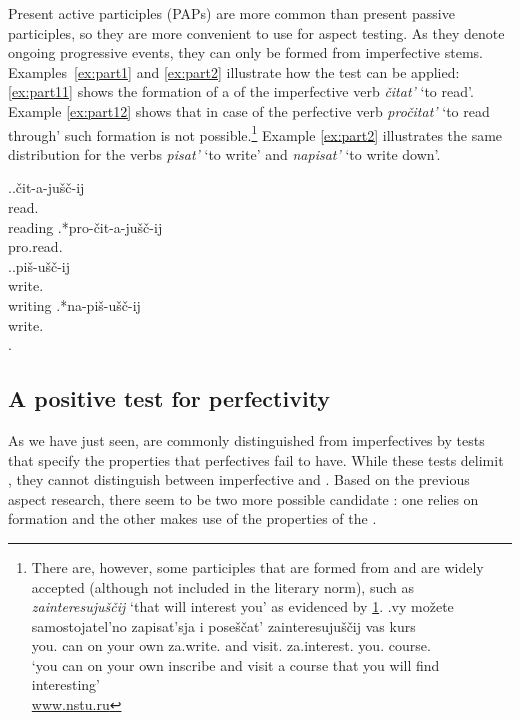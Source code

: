 Present active participles  (PAPs) are more common than present passive participles, so they are more convenient to use for aspect testing. As they denote ongoing progressive events, they can only be formed from imperfective stems. Examples~\ref{ex:part1} and \ref{ex:part2} illustrate how the test can be applied: \ref{ex:part11} shows the formation of a  of the imperfective verb \textit{\v{c}itat'} `to read'. Example \ref{ex:part12} shows that in case of the perfective verb \textit{pro\v{c}itat'} `to read through' such formation is not possible.\footnote{There are, however, some participles that are formed from  and are widely accepted (although not included in the literary norm), such as \textit{zainteresuju\v{s}\v{c}ij} `that will interest you' as evidenced by \ref{ex:PFP}.
\exg.\label{ex:PFP}vy mo\v{z}ete samostojatel'no zapisat'sja i pose\v{s}\v{c}at' zainteresuju\v{s}\v{c}ij vas kurs\\
you. can {on your own} za.write. and visit. za.interest. you. course.\\
\trans `you can on your own inscribe and visit a course that you will find interesting'\\\hbox{} \hfill \hbox{\url{www.nstu.ru}}

} Example \ref{ex:part2} illustrates the same distribution for the verbs \textit{pisat'}\textsuperscript{\IPF} `to write' and \textit{napisat'}\textsuperscript{\PF} `to write down'.

\ex.\label{ex:part1}\ag.\label{ex:part11}\v{c}it-a-ju\v{s}\v{c}-ij\\
read\textsuperscript{\IPF}.\\
reading
\bg.\label{ex:part12}*pro-\v{c}it-a-ju\v{s}\v{c}-ij\\
pro.read\textsuperscript{\PF}.\\

\ex.\label{ex:part2}\ag.\label{ex:part21}pi\v{s}-u\v{s}\v{c}-ij\\
write\textsuperscript{\IPF}.\\
writing
\bg.\label{ex:part22}*na-pi\v{s}-u\v{s}\v{c}-ij\\
write\textsuperscript{\PF}.\\
\z.


\subsection{A positive test for perfectivity}\label{sec:tests:new}
As we have just seen,  are commonly distinguished from imperfectives by tests that specify the properties that perfectives fail to have. While these tests delimit , they cannot distinguish between imperfective and . Based on the previous aspect research, there seem to be two more possible candidate : one relies on  formation and the other makes use of the properties of the . %

